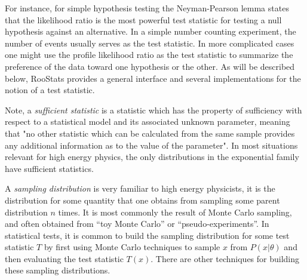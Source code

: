 \documentclass[11pt]{article}
\begin{document}
For instance, for simple hypothesis testing the Neyman-Pearson lemma states that the likelihood ratio is the most powerful test statistic for testing a null hypothesis against an alternative.  In a simple number counting experiment, the number of events usually serves as the test statistic.  In more complicated cases one might use the profile likelihood ratio as the test statistic to summarize the preference of the data toward one hypothesis or the other.  As will be described below, RooStats provides a general interface and several implementations for the notion of a test statistic.

Note, a \textit{sufficient statistic} is a statistic which has the property of sufficiency with respect to a statistical model and its associated unknown parameter, meaning that "no other statistic which can be calculated from the same sample provides any additional information as to the value of the parameter".  In most situations relevant for high energy physics, the only distributions in the exponential family have sufficient statistics.

A \textit{sampling distribution} is very familiar to high energy physicists, it is the distribution for some quantity that one obtains from sampling some parent distribution $n$ times.  It is most commonly the result of Monte Carlo sampling, and often obtained from ``toy Monte Carlo'' or ``pseudo-experiments''.  In statistical tests, it is common to build the sampling distribution for some test statistic $T$ by first using Monte Carlo techniques to sample $x$ from $P(x|\theta)$ and then evaluating the test statistic $T(x)$.  There are other techniques for building these sampling distributions.
\end{document}
